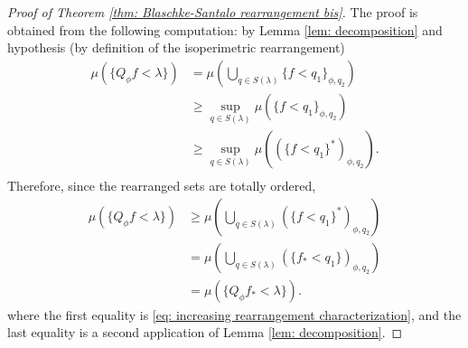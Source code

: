 \documentclass[11pt]{article}
\newcommand{\1}{[1]}
\begin{document}
\begin{proof}[Proof of Theorem \ref{thm: Blaschke-Santalo rearrangement bis}]
The proof is obtained from the following computation: by Lemma \ref{lem: decomposition} and hypothesis (by definition of the isoperimetric rearrangement)        
    \begin{align*}
        \mu (\{ Q_\phi f < \lambda \} )
            &=
                \mu \left( \bigcup_{q \in S(\lambda)} \{ f < q_1 \}_{\phi,q_2} \right)
                    \\
            &\geq 
                \sup_{q \in S(\lambda)} \mu  \left( \{ f < q_1 \}_{\phi,q_2} \right)
                   \\
            &\geq 
                \sup_{q \in S(\lambda)} \mu  \left( (\{ f < q_1 \}^*)_{\phi,q_2} \right) .
                \\
  \end{align*}
Therefore, since the rearranged sets are totally ordered,          
    \begin{align*} 
    \mu (\{ Q_\phi f < \lambda \} )
            & \geq 
                \mu \left( \bigcup_{q \in S(\lambda)} (\{ f < q_1 \}^*)_{\phi,q_2} \right)
                \\
            &=
                \mu \left( \bigcup_{q \in S(\lambda)} (\{ f_* < q_1 \})_{\phi,q_2} \right)
                    \\
            &=
                \mu (\{ Q_\phi f_* < \lambda \} ).
    \end{align*}
    where the first equality is \eqref{eq: increasing rearrangement characterization}, and the last equality is a second application of Lemma \ref{lem: decomposition}.


\end{proof}
\end{document}
